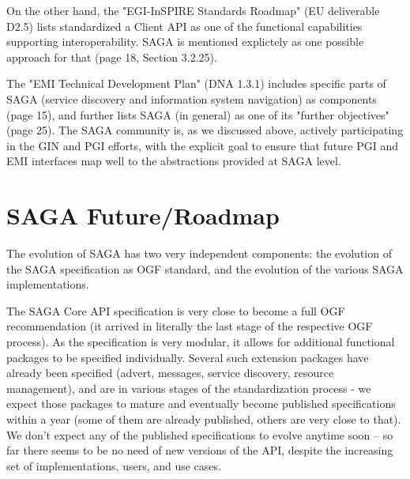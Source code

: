 \documentclass[12pt]{article}
\begin{document}
On the other hand, the "EGI-InSPIRE Standards Roadmap" (EU deliverable
D2.5) lists standardized a Client API as one of the functional
capabilities supporting interoperability.  SAGA is mentioned
explictely as one possible approach for that (page 18, Section
3.2.25).

The "EMI Technical Development Plan" (DNA 1.3.1) includes specific
parts of SAGA (service discovery and information system navigation) as
components (page 15), and further lists SAGA (in general) as one of
its "further objectives" (page 25).  The SAGA community is, as we
discussed above, actively participating in the GIN and PGI efforts,
with the explicit goal to ensure that future PGI and EMI interfaces
map well to the abstractions provided at SAGA level.



\section{SAGA Future/Roadmap}

 The evolution of SAGA has two very independent components: the
 evolution of the SAGA specification as OGF standard, and the
 evolution of the various SAGA implementations.

 The SAGA Core API specification is very close to become a full OGF
 recommendation (it arrived in literally the last stage of the
 respective OGF process).  As the specification is very modular, it
 allows for additional functional packages to be specified
 individually.  Several such extension packages have already been
 specified (advert, messages, service discovery, resource management),
 and are in various stages of the standardization process - we expect
 those packages to mature and eventually become published
 specifications within a year (some of them are already published,
 others are very close to that).  We don't expect any of the published
 specifications to evolve anytime soon -- so far there seems to be no
 need of new versions of the API, despite the increasing set of
 implementations, users, and use cases.
\end{document}
